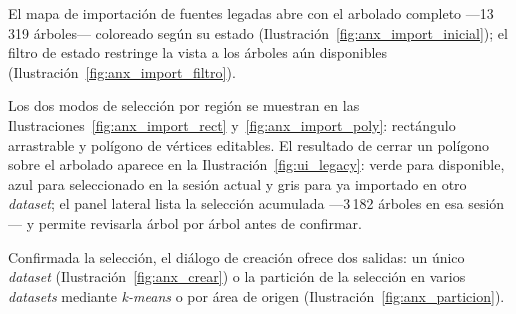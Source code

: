 
El mapa de importación de fuentes legadas abre con el arbolado completo
---13\,319 árboles--- coloreado según su estado (Ilustración~\ref{fig:anx_import_inicial}); el
filtro de estado restringe la vista a los árboles aún disponibles
(Ilustración~\ref{fig:anx_import_filtro}).



Los dos modos de selección por región se muestran en las
Ilustraciones~\ref{fig:anx_import_rect} y~\ref{fig:anx_import_poly}: rectángulo arrastrable y
polígono de vértices editables. El resultado de cerrar un polígono sobre el arbolado aparece en la
Ilustración~\ref{fig:ui_legacy}: verde para disponible, azul para seleccionado en la sesión actual
y gris para ya importado en otro \textit{dataset}; el panel lateral lista la selección acumulada
---3\,182 árboles en esa sesión--- y permite revisarla árbol por árbol antes de confirmar.




Confirmada la selección, el diálogo de creación ofrece dos salidas: un único \textit{dataset}
(Ilustración~\ref{fig:anx_crear}) o la partición de la selección en varios \textit{datasets}
mediante \textit{k-means} o por área de origen (Ilustración~\ref{fig:anx_particion}).



